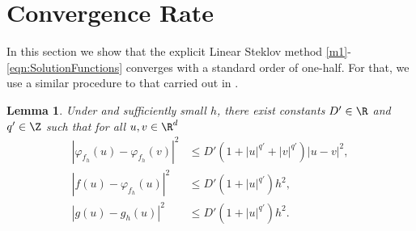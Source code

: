 \documentclass[sort&compress, preprint]{elsarticle}
\theoremstyle{definition}
\theoremstyle{plain}%
\newtheorem{lem}{Lemma}[section]
\theoremstyle{remark}
\begin{document}
\section{Convergence Rate} 
 
 In this section we show that the explicit Linear Steklov method 
 \eqref{m1}-\eqref{eqn:SolutionFunctions} converges  with a standard order of one-half. For that,
 we use a similar procedure  to that carried out in  \cite{Higham2002b}.
 
\begin{lem}
	Under  and sufficiently small $h$, there exist
	constants $D'\in \R$ and $q'\in \Z$ such that for all $u,v\in \R^d$
	\begin{align}
		|
			\varphi_{f_h}(u)
			-\varphi_{f_h}(v)
		|^2 
		&\leq
			D'
			\left(
				1 +|u|^{q'} +|v|^{q'}
			\right)
			|u-v|^2, \\
		|
			 f(u) -\varphi_{f_h}(u)
		|^2 
		&\leq
			D'
			\left(
				1 +|u|^{q'} 
				\right)
			h^2, \\
		|
			g(u) -g_h(u)
		|^2 				 
		&\leq
			D'
			\left(
				1 +|u|^{q'} 
			\right)
			h^2 . \label{eqn:ghPolyGrowth}
	\end{align}
\end{lem}
\end{document}
